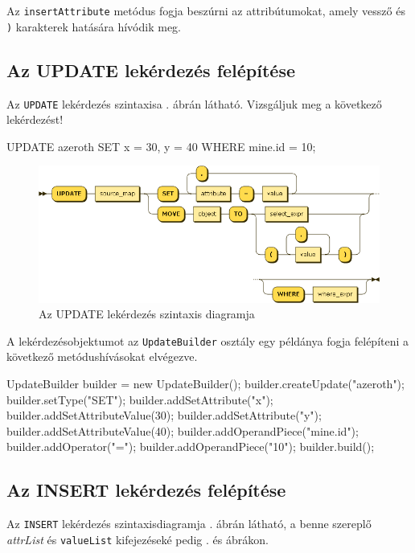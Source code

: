 Az \texttt{insertAttribute} metódus fogja beszúrni az attribútumokat, amely vessző és \texttt{)} karakterek hatására hívódik meg.

\subsection{Az UPDATE lekérdezés felépítése}

Az \texttt{UPDATE} lekérdezés szintaxisa . ábrán látható. Vizsgáljuk meg a következő lekérdezést!
\begin{sql}
UPDATE azeroth SET x = 30, y = 40 WHERE mine.id = 10;
\end{sql}

\begin{figure}[htb]
	\begin{center}
		\includegraphics[scale=0.59]{images/update_expr}
		\caption{Az UPDATE lekérdezés szintaxis diagramja}
		\label{fig:updateSytnax}
	\end{center}
\end{figure}

A lekérdezésobjektumot az \texttt{UpdateBuilder} osztály egy példánya fogja felépíteni a következő  metódushívásokat elvégezve.

\begin{java}
UpdateBuilder builder = new UpdateBuilder();
builder.createUpdate("azeroth");
builder.setType("SET");
builder.addSetAttribute("x");
builder.addSetAttributeValue(30);
builder.addSetAttribute("y");
builder.addSetAttributeValue(40);
builder.addOperandPiece("mine.id");
builder.addOperator("=");
builder.addOperandPiece("10");
builder.build();
\end{java}

\subsection{Az INSERT lekérdezés felépítése}

Az \texttt{INSERT} lekérdezés szintaxisdiagramja . ábrán látható, a benne szereplő \textit{attrList} és \texttt{valueList} kifejezéseké pedig . és  ábrákon.

